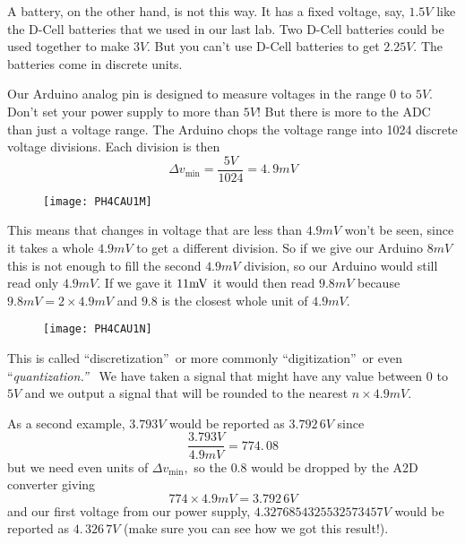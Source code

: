 A battery, on the other hand, is not this way. It has a fixed voltage, say, $%
1.5\unit{V}$ like the D-Cell batteries that we used in our last lab. Two
D-Cell batteries could be used together to make $3\unit{V}.$ But you can't
use D-Cell batteries to get $2.25\unit{V}.$ The batteries come in discrete
units.

Our Arduino analog pin is designed to measure voltages in the range $0$ to $5%
\unit{V}.$ Don't set your power supply to more than $5\unit{V}!$ But there
is more to the ADC than just a voltage range. The Arduino chops the voltage
range into 1024 discrete voltage divisions. Each division is then%
\begin{equation*}
\Delta v_{\min }=\frac{5\unit{V}}{1024}=4.\,\allowbreak 9\unit{mV}
\end{equation*}%
\begin{figure}[h!]
\texttt{[image: PH4CAU1M]}
\end{figure} This means that changes in
voltage that are less than $4.9\unit{mV}$ won't be seen, since it takes a
whole $4.9\unit{mV}$ to get a different division. So if we give our Arduino $%
8\unit{mV}$ this is not enough to fill the second $4.9\unit{mV}$ division,
so our Arduino would still read only $4.9\unit{mV}.$ If we gave it $11\unit{%
mV}$ it would then read $9.8\unit{mV}$ because $9.8\unit{mV}=2\times 4.9%
\unit{mV}$ and $9.8$ is the closest whole unit of $4.9\unit{mV}.$\begin{figure}[h!]
\texttt{[image: PH4CAU1N]}
\end{figure}%
This is called \textquotedblleft discretization\textquotedblright\ or more
commonly \textquotedblleft digitization\textquotedblright\ or even
\textquotedblleft \emph{quantization.\textquotedblright\ } We have taken a
signal that might have any value between $0$ to $5\unit{V}$ and we output a
signal that will be rounded to the nearest $n\times 4.9\unit{mV}.$

As a second example, $3.793\unit{V}$ would be reported as $\allowbreak
3.792\,\allowbreak 6\unit{V}$ since 
\begin{equation*}
\frac{3.793\unit{V}}{4.9\unit{mV}}=774.\,\allowbreak 08
\end{equation*}%
but we need even units of $\Delta v_{\min },$ so the $0.8$ would be dropped
by the A2D converter giving 
\begin{equation*}
774\times 4.9\unit{mV}=\allowbreak 3.792\,\allowbreak 6\unit{V}
\end{equation*}%
and our first voltage from our power supply, $4.3276854325532573457\unit{V}$
would be reported as $4.\,\allowbreak 326\,7\unit{V}$ (make sure you can see
how we got this result!).


